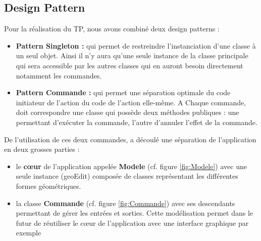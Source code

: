 \documentclass[12pt]{article}
\begin{document}
\subsection{Design Pattern}
Pour la réalisation du TP, nous avons combiné deux design patterns :
\begin{itemize}
\item \textbf{Pattern Singleton :} qui permet de restreindre l'instanciation d’une classe à un seul objet. Ainsi il n’y aura qu’une seule instance de la classe principale qui sera accessible par les autres classes qui en auront besoin directement notamment les commandes.
\item \textbf{Pattern Commande :} qui permet une séparation optimale du code initiateur de l’action du code de l’action elle-même. A Chaque commande, doit correspondre une classe qui possède deux méthodes publiques : une permettant d’exécuter la commande, l’autre d’annuler l’effet de la commande. 
\end{itemize}
De l’utilisation de ces deux commandes, a découlé une séparation de l’application en deux grosses parties :
\begin{itemize}
\item le \textbf{c\oe{}ur} de l’application appelée \textbf{Modele} (cf. figure \ref{fig:Modele}) avec une seule instance (geoEdit) composée de classes représentant les différentes formes géométriques.
\item la classe \textbf{Commande} (cf. figure \ref{fig:Commande}) avec ses descendants permettant de gérer les entrées et sorties. Cette modélisation permet dans le futur de réutiliser le c\oe{}ur de l’application avec une interface graphique par exemple
\end{itemize}
\end{document}
